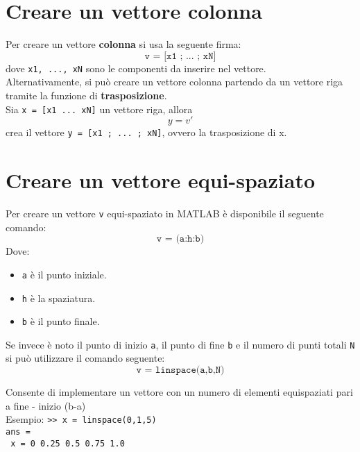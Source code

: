 \newpage

\section{Creare un vettore colonna}
Per creare un vettore \textbf{colonna} si usa la seguente firma:
$$ \texttt{v = [x1 ; ... ; xN]} $$
dove \texttt{x1, ..., xN} sono le componenti da inserire nel vettore. \\
Alternativamente, si può creare un vettore colonna partendo da un vettore riga tramite la funzione di 
\textbf{trasposizione}. \\
Sia \texttt{x = [x1 ... xN]} un vettore riga, allora 
$$ y = v' $$
crea il vettore \texttt{y = [x1 ; ... ; xN]}, ovvero la trasposizione di x.

\section{Creare un vettore equi-spaziato}
Per creare un vettore \texttt{v} equi-spaziato in MATLAB è disponibile il seguente comando:
$$ \texttt{v = (a:h:b)} $$
Dove:
\begin{itemize}
	\item 	\texttt{a} è il punto iniziale.
	\item	\texttt{h} è la spaziatura.
	\item	\texttt{b} è il punto finale.
\end{itemize}

Se invece è noto il punto di inizio \texttt{a}, il punto di fine \texttt{b} e il numero di punti totali \texttt{N} si 
può utilizzare il comando seguente:
$$ \texttt{v = linspace(a,b,N)} $$

Consente di implementare un vettore con un numero di elementi equispaziati pari a fine - inizio (b-a)\\
Esempio:
\texttt{>> x = linspace(0,1,5)} \\
\texttt{ans = } \\
\texttt{\hspace{0.5cm} x = 0 \hspace{0.5cm} 0.25 \hspace{0.5cm} 0.5 \hspace{0.5cm} 0.75 \hspace{0.5cm} 1.0} \break

